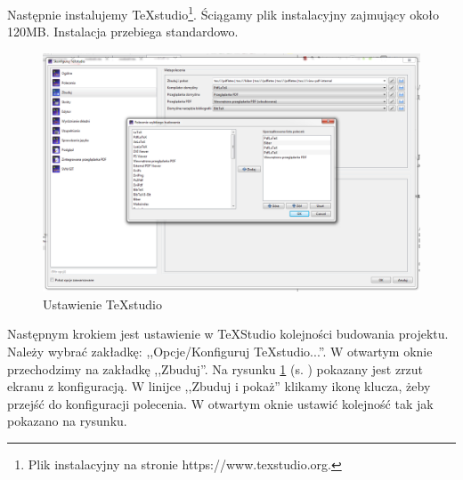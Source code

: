 Następnie instalujemy \TeX{}studio\footnote{Plik instalacyjny na stronie  https://www.texstudio.org\cite{www3}.}. Ściągamy plik instalacyjny zajmujący około 120MB. Instalacja przebiega standardowo.

\begin{figure}[!hbt]
	\begin{center}
		\includegraphics[width=\linewidth]{rys/ustawienie.png}
		\caption{Ustawienie TeXstudio}
		\label{rys:ustawienia}
	\end{center}
\end{figure}

Następnym krokiem jest ustawienie w \TeX{}Studio kolejności budowania projektu. Należy wybrać zakładkę: ,,Opcje/Konfiguruj \TeX{}studio...''. W otwartym oknie przechodzimy na zakładkę ,,Zbuduj''. Na rysunku \ref{rys:ustawienia} (s. \pageref{rys:ustawienia}) pokazany jest zrzut ekranu z konfiguracją. W linijce ,,Zbuduj i pokaż'' klikamy ikonę klucza, żeby przejść do konfiguracji polecenia. W otwartym oknie ustawić kolejność tak jak pokazano na rysunku.

 
 
 
 
 